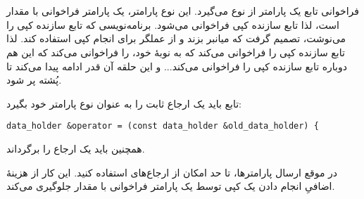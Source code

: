 \section{}
\paragraph{}\label{answer:12}
فراخوانی تابع  یک پارامتر از نوع  می‌گیرد. این نوع پارامتر، یک پارامتر فراخوانی با مقدار است، لذا تابع سازنده کپی فراخوانی می‌شود. برنامه‌نویسی که تابع سازنده کپی را می‌نوشت، تصمیم گرفت که میانبر بزند و از عملگر \lr{\texttt{=}} برای انجام کپی استفاده کند. لذا  تابع سازنده کپی را فراخوانی می‌کند که به نوبهٔ خود،   را فراخوانی می‌کند که این هم دوباره تابع سازنده کپی را فراخوانی می‌کند... و این حلقه آن قدر ادامه پیدا می‌کند تا پُشته پر شود.

تابع   باید یک ارجاع ثابت را به عنوان نوع پارامتر خود بگیرد:
\begin{LTR}
    \begin{lstlisting}[style=C++Style]
        data_holder &operator = (const data_holder &old_data_holder) {
    \end{lstlisting}
\end{LTR}
همچنین باید یک ارجاع را برگرداند.

در موقع ارسال پارامترها، تا حد امکان از ارجاع‌های  استفاده کنید. این کار از هزینهٔ اضافیِ انجام دادن یک کپی توسط یک پارامتر فراخوانی با مقدار جلوگیری می‌کند.